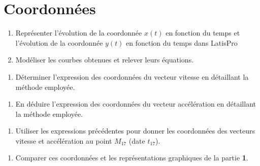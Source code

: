 \documentclass[a4paper,11pt,fleqn]{article}%
\begin{document}
\section{Coordonnées}
\begin{enumerate}[resume]
	\item Représenter l'évolution de la coordonnée $x(t)$ en fonction du temps et l'évolution de la coordonnée $y(t)$ en fonction du temps dans LatisPro
	\item Modéliser les courbes obtenues et relever leurs équations.\end{enumerate}
	\noindent {}
	\begin{enumerate}[resume]
	\item Déterminer l'expression des coordonnées du vecteur vitesse en détaillant la méthode employée.\end{enumerate}
	\noindent {}
	\begin{enumerate}[resume]
	\item En déduire l'expression des coordonnées du vecteur accélération en détaillant la méthode employée.\end{enumerate}
	\noindent {}
	\begin{enumerate}[resume]
	\item Utiliser les expressions précédentes pour donner les coordonnées des vecteurs vitesse et accélération au point $M_{17}$ (date $t_{17}$).\end{enumerate}
	\noindent {}
	\begin{enumerate}[resume]
	\item Comparer ces coordonnées et les représentations graphiques de la partie \textbf{1}.
\end{enumerate}

\begin{figure}
\end{figure}
\end{document}

